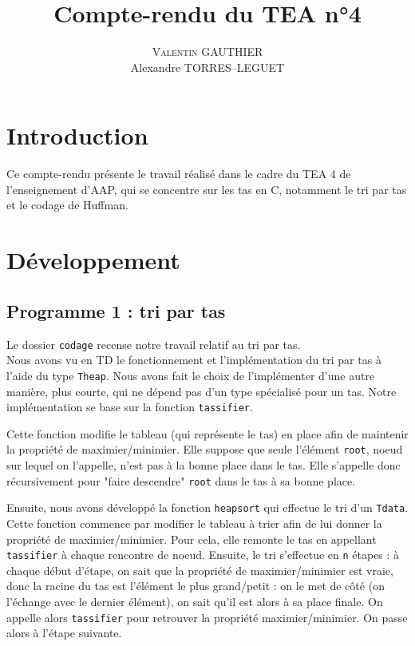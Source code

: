 \documentclass[11pt]{article}
\title{Compte-rendu du TEA n°4}
\author{\textsc{Valentin GAUTHIER}\\ Alexandre TORRES--LEGUET}
\begin{document}
\maketitle

\section{Introduction}

\quad \quad Ce compte-rendu présente le travail réalisé dans le cadre du TEA 4 de l'enseignement d'AAP, qui se concentre sur les tas en \textsc{C}, notamment le tri par tas et le codage de Huffman.

\section{Développement}

\subsection{Programme 1 : tri par tas}

\quad \quad Le dossier \texttt{codage} recense notre travail relatif au tri par tas.\\

Nous avons vu en TD le fonctionnement et l'implémentation du tri par tas à l'aide du type \texttt{T\textunderscore heap}. Nous avons fait le choix de l'implémenter d'une autre manière, plus courte, qui ne dépend pas d'un type spécialisé pour un tas. Notre implémentation se base sur la fonction \texttt{tassifier}.

Cette fonction modifie le tableau (qui représente le tas) en place afin de maintenir la propriété de maximier/minimier. Elle suppose que seule l'élément \texttt{root}, noeud sur lequel on l'appelle, n'est pas à la bonne place dans le tas. Elle s'appelle donc récursivement pour "faire descendre" \texttt{root} dans le tas à sa bonne place.

Ensuite, nous avons développé la fonction \texttt{heap\textunderscore sort} qui effectue le tri d'un \texttt{T\textunderscore data}.
Cette fonction commence par modifier le tableau à trier afin de lui donner la propriété de maximier/minimier. Pour cela, elle remonte le tas en appellant \texttt{tassifier} à chaque rencontre de noeud. Ensuite, le tri s'effectue en \texttt{n} étapes : à chaque début d'étape, on sait que la propriété de maximier/minimier est vraie, donc la racine du tas est l'élément le plus grand/petit : on le met de côté (on l'échange avec le dernier élément), on sait qu'il est alors à sa place finale. On appelle alors \texttt{tassifier} pour retrouver la propriété maximier/minimier. On passe alors à l'étape suivante.
\end{document}
